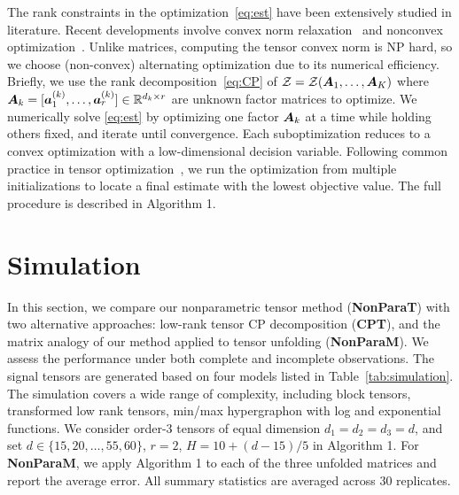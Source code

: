 \documentclass{article}
\theoremstyle{plain}
\theoremstyle{definition}
\def\sign{\textup{sgn}}
\begin{document}
The rank constraints in the optimization~\eqref{eq:est} have been extensively studied in literature. Recent developments involve convex norm relaxation~\cite{ghadermarzy2018learning} and nonconvex optimization~\cite{wang2018learning, han2020optimal}. Unlike matrices, computing the tensor convex norm is NP hard, so we choose (non-convex) alternating optimization due to its numerical efficiency. Briefly, we use the rank decomposition~\eqref{eq:CP} of $\mathcal{Z}=\mathcal{Z}(\bm A_1,\ldots, \bm A_K)$ 
where $\bm A_k=[\bm{a}^{(k)}_1,\ldots,\bm{a}^{(k)}_r]\in\mathbb{R}^{d_k\times r}$ are unknown factor matrices to optimize. We numerically solve \eqref{eq:est} by optimizing one factor $\bm A_k$ at a time while holding others fixed, and iterate until convergence. Each suboptimization reduces to a convex optimization with a low-dimensional decision variable. Following common practice in tensor optimization~\cite{anandkumar2014tensor,hong2020generalized}, we run the optimization from multiple initializations to locate a final estimate with the lowest objective value. The full procedure is described in Algorithm 1.


\section{Simulation}\label{sec:simulation}
In this section, we compare our nonparametric tensor method ({\bf NonParaT}) with two alternative approaches: low-rank tensor CP decomposition ({\bf CPT}), and the matrix analogy of our method applied to tensor unfolding ({\bf NonParaM}). We assess the performance under both complete and incomplete observations. The signal tensors are generated based on four models listed in Table~\ref{tab:simulation}. The simulation covers a wide range of complexity, including block tensors, transformed low rank tensors, min/max hypergraphon with log and exponential functions. We consider order-3  tensors of equal dimension $d_1=d_2=d_3=d$, and set $d\in \{15, 20,\ldots,55,60\}$, $r=2$, $H=10+{(d-15)/ 5}$ in Algorithm 1. For {\bf NonParaM}, we apply Algorithm 1 to each of the three unfolded matrices and report the average error. All summary statistics are averaged across $30$ replicates.  
\end{document}
